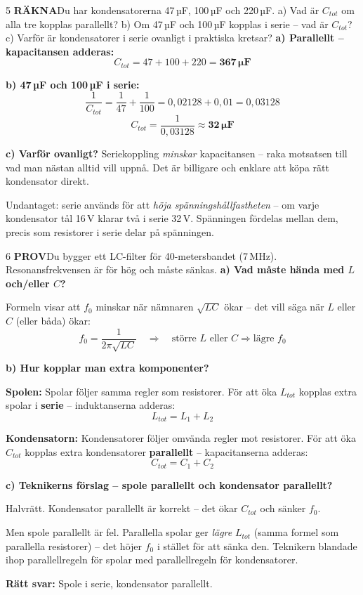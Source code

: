 \documentclass[a4paper,11pt,twoside]{book}
\newcommand{\qrakna}{\colorbox{bluepale}{\textcolor{bluedark}{\headingfont\bfseries\tiny RÄKNA}}}
\newcommand{\qprov}{\colorbox{redpale}{\textcolor{reddark}{\headingfont\bfseries\tiny PROV}}}
\begin{document}
\begin{facitblock}{5}
\qrakna\quad Du har kondensatorerna 47\,µF, 100\,µF 
och 220\,µF.
a) Vad är $C_{tot}$ om alla tre kopplas parallellt?
b) Om 47\,µF och 100\,µF kopplas i serie -- vad är $C_{tot}$?
c) Varför är kondensatorer i serie ovanligt i 
praktiska kretsar?
\tcblower
\textbf{a) Parallellt -- kapacitansen adderas:}
\[ C_{tot} = 47 + 100 + 220 = \mathbf{367\,\mu\text{F}} \]

\textbf{b) 47\,µF och 100\,µF i serie:}
\[ \frac{1}{C_{tot}} = \frac{1}{47} + \frac{1}{100} 
   = 0{,}02128 + 0{,}01 = 0{,}03128 \]
\[ C_{tot} = \frac{1}{0{,}03128} \approx \mathbf{32\,\mu\text{F}} \]

\textbf{c) Varför ovanligt?}
Seriekoppling \emph{minskar} kapacitansen -- raka 
motsatsen till vad man nästan alltid vill uppnå. 
Det är billigare och enklare att köpa rätt 
kondensator direkt.

Undantaget: serie används för att \emph{höja 
spänningshållfastheten} -- om varje kondensator 
tål 16\,V klarar två i serie 32\,V. Spänningen 
fördelas mellan dem, precis som resistorer i serie 
delar på spänningen.
\end{facitblock}

\begin{facitblock}{6}
\qprov\quad Du bygger ett LC-filter för 40-metersbandet 
(7\,MHz). Resonansfrekvensen är för hög och måste sänkas.
\tcblower
\textbf{a) Vad måste hända med $L$ och/eller $C$?}

Formeln visar att $f_0$ minskar när nämnaren $\sqrt{LC}$ 
ökar -- det vill säga när $L$ eller $C$ (eller båda) 
ökar:
\[ f_0 = \frac{1}{2\pi\sqrt{LC}} \quad \Rightarrow \quad \text{större } L \text{ eller } C \Rightarrow \text{lägre } f_0 \]

\textbf{b) Hur kopplar man extra komponenter?}

\textbf{Spolen:} Spolar följer samma regler som 
resistorer. För att öka $L_{tot}$ kopplas extra 
spolar i \textbf{serie} -- induktanserna adderas:
\[ L_{tot} = L_1 + L_2 \]

\textbf{Kondensatorn:} Kondensatorer följer omvända 
regler mot resistorer. För att öka $C_{tot}$ kopplas 
extra kondensatorer \textbf{parallellt} -- 
kapacitanserna adderas:
\[ C_{tot} = C_1 + C_2 \]

\textbf{c) Teknikerns förslag -- spole parallellt och 
kondensator parallellt?}

Halvrätt. Kondensator parallellt är korrekt -- det 
ökar $C_{tot}$ och sänker $f_0$.

Men spole parallellt är fel. Parallella spolar ger 
\emph{lägre} $L_{tot}$ (samma formel som parallella 
resistorer) -- det höjer $f_0$ i stället för att 
sänka den. Teknikern blandade ihop parallellregeln 
för spolar med parallellregeln för kondensatorer.

\textbf{Rätt svar:} Spole i serie, kondensator 
parallellt.
\end{facitblock}
\end{document}
